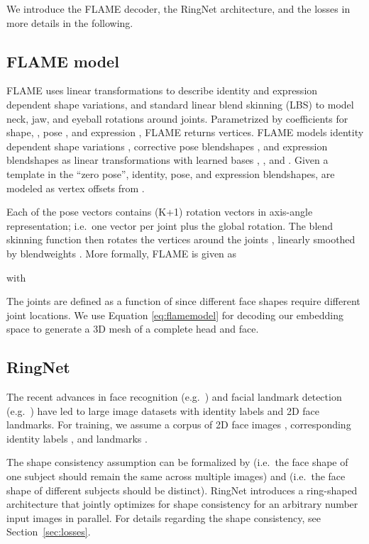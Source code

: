 We introduce the FLAME decoder, the RingNet architecture, and the losses in more details in the following. 


\subsection{FLAME model}

FLAME uses linear transformations to describe identity and expression dependent shape variations, and standard linear blend skinning (LBS) to model neck, jaw, and eyeball rotations around  joints. 
Parametrized by coefficients for shape, , pose , and expression , FLAME returns  vertices. 
FLAME models identity dependent shape variations , corrective pose blendshapes , and expression blendshapes  as linear transformations with learned bases , , and . 
Given a template  in the ``zero pose'', identity, pose, and expression blendshapes, are modeled as vertex offsets from .

Each of the pose vectors  contains (K+1) rotation vectors in axis-angle representation;  i.e.~one vector per joint plus the global rotation. 
The blend skinning function  then rotates the vertices around the joints , linearly smoothed by blendweights . 
More formally, FLAME is given as

with

The joints are defined as a function of  since different face shapes require different joint locations. 
We use Equation \ref{eq:flamemodel} for decoding our embedding space to generate a 3D mesh of a complete head and face. 

\subsection{RingNet}

The recent advances in face recognition (e.g.~\cite{Zhang2017}) and facial landmark detection (e.g.~\cite{bulat2017far,simon2017hand}) have led to large image datasets with identity labels and 2D face landmarks. For training, we assume a corpus of 2D face images , corresponding identity labels , and landmarks . 

The shape consistency assumption can be formalized by  (i.e.~the face shape of one subject should remain the same across multiple images) and  (i.e.~the face shape of different subjects should be distinct). RingNet introduces a ring-shaped architecture that jointly optimizes for shape consistency for an arbitrary number input images in parallel. For details regarding the shape consistency, see Section~\ref{sec:losses}.

